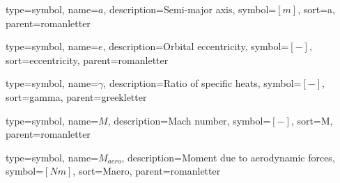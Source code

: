 %

{
type=symbol, %
name={\ensuremath{a}}, %
description={Semi-major axis}, %
symbol={$\left[m\right]$}, %
sort=a, %
parent=romanletter %
}

{
type=symbol, %
name={\ensuremath{e}}, %
description={Orbital eccentricity}, %
symbol={$\left[-\right]$}, %
sort=eccentricity, %
parent=romanletter %
}

{
type=symbol, %
name={\ensuremath{\gamma}}, %
description={Ratio of specific heats}, %
symbol={$\left[-\right]$}, %
sort=gamma, %
parent=greekletter %
}

{
type=symbol, %
name={\ensuremath{M}}, %
description={Mach number}, %
symbol={$\left[-\right]$}, %
sort=M, %
parent=romanletter %
}

{
	type=symbol, %
	name={\ensuremath{M_{aero}}}, %
	description={Moment due to aerodynamic forces}, %
	symbol={$\left[Nm\right]$}, %
	sort=Maero, %
	parent=romanletter %
}

